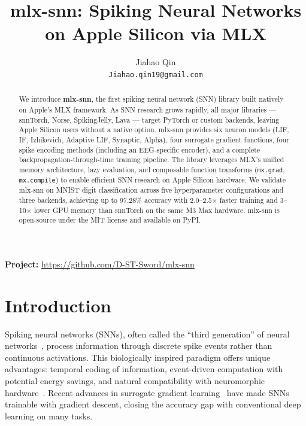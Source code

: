 \documentclass[11pt]{article}
\title{\textbf{mlx-snn: Spiking Neural Networks on Apple Silicon via MLX}}
\author{
    Jiahao Qin \\
    \texttt{Jiahao.qin19@gmail.com}
}
\date{}
\begin{document}
\maketitle

\begin{abstract}
We introduce \textbf{mlx-snn}, the first spiking neural network (SNN) library built natively on Apple's MLX framework. As SNN research grows rapidly, all major libraries --- snnTorch, Norse, SpikingJelly, Lava --- target PyTorch or custom backends, leaving Apple Silicon users without a native option. mlx-snn provides six neuron models (LIF, IF, Izhikevich, Adaptive LIF, Synaptic, Alpha), four surrogate gradient functions, four spike encoding methods (including an EEG-specific encoder), and a complete backpropagation-through-time training pipeline. The library leverages MLX's unified memory architecture, lazy evaluation, and composable function transforms (\texttt{mx.grad}, \texttt{mx.compile}) to enable efficient SNN research on Apple Silicon hardware. We validate mlx-snn on MNIST digit classification across five hyperparameter configurations and three backends, achieving up to 97.28\% accuracy with 2.0--2.5$\times$ faster training and 3--10$\times$ lower GPU memory than snnTorch on the same M3 Max hardware. mlx-snn is open-source under the MIT license and available on PyPI.
\end{abstract}

\noindent\textbf{Project:} \url{https://github.com/D-ST-Sword/mlx-snn}

\section{Introduction}

Spiking neural networks (SNNs), often called the ``third generation'' of neural networks~\citep{maass1997networks}, process information through discrete spike events rather than continuous activations. This biologically inspired paradigm offers unique advantages: temporal coding of information, event-driven computation with potential energy savings, and natural compatibility with neuromorphic hardware~\citep{davies2018loihi}. Recent advances in surrogate gradient learning~\citep{neftci2019surrogate} have made SNNs trainable with gradient descent, closing the accuracy gap with conventional deep learning on many tasks.
\end{document}
